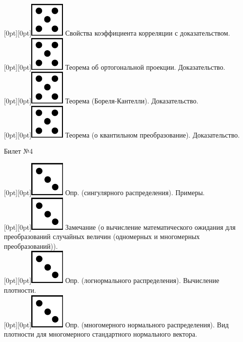 \documentclass[10pt]{article}
\begin{document}
\raisebox{-1pt}[0pt][0pt]{\includegraphics[width=0.02\linewidth]{5.png}} Свойства коэффициента корреляции с доказательством. \\

\raisebox{-1pt}[0pt][0pt]{\includegraphics[width=0.02\linewidth]{5.png}} Теорема об ортогональной проекции. Доказательство. \\

\raisebox{-1pt}[0pt][0pt]{\includegraphics[width=0.02\linewidth]{5.png}} Теорема (Бореля-Кантелли). Доказательство. \\

\raisebox{-1pt}[0pt][0pt]{\includegraphics[width=0.02\linewidth]{5.png}}  Теорема (о квантильном преобразование). Доказательство. \\

\begin{center} {\Large Билет №4} \end{center} 

\raisebox{-1pt}[0pt][0pt]{\includegraphics[width=0.02\linewidth]{3.png}} Опр. (сингулярного распределения). Примеры. \\

\raisebox{-1pt}[0pt][0pt]{\includegraphics[width=0.02\linewidth]{3.png}} Замечание (о вычисление  математического ожидания для преобразований случайных величин (одномерных и многомерных преобразований)). \\

\raisebox{-1pt}[0pt][0pt]{\includegraphics[width=0.02\linewidth]{3.png}} Опр. (логнормального распределения). Вычисление плотности. \\

\raisebox{-1pt}[0pt][0pt]{\includegraphics[width=0.02\linewidth]{3.png}} Опр. (многомерного нормального распределения). Вид плотности для многомерного стандартного нормального вектора. \\ 
\end{document}
